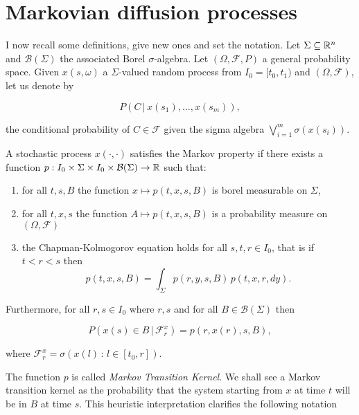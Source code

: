 \section{Markovian diffusion processes}

I now recall some definitions, give new ones and set the notation. Let $\Sigma\subseteq\mathbb{R}^n$ and $\mathcal{B}(\Sigma)$ 
the associated Borel $\sigma$-algebra. Let $(\Omega, \mathcal{F}, P)$ a general probability space. 
Given $x(s,\omega)$ a $\Sigma$-valued random process from $I_0=[t_0,t_1)$ and $(\Omega,\mathcal{F})$, let us denote by

\[P(C\,|\,x(s_1),\dots,x(s_m)),\]

the conditional probability of $C\in\mathcal{F}$ given the sigma algebra $\bigvee_{i=1}^m\sigma(x(s_i))$.

\begin{definition}\label{2-1-markovprocessdef}
    A stochastic process $x(\cdot, \cdot)$ satisfies the Markov property if there exists a function 
    $p:I_0\times \Sigma\times I_0\times  \mathcal{B}(\Sigma)\rightarrow \mathbb{R}$ such that:

    \begin{enumerate}
        \item for all $t,s,B$ the function $x\mapsto p(t,x,s,B)$ is borel measurable on $\Sigma$,
        \item for all $t,x,s$ the function $A\mapsto p(t,x,s,B)$ is a probability measure on $(\Omega,\mathcal{F})$
        \item the Chapman-Kolmogorov equation holds for all $s,t,r\in I_0$, that is if $t<r<s$ then
        \begin{equation}\label{2-1-markovprocessdef-chapkol}
            p(t,x,s,B) = \int_{\Sigma} p(r,y,s,B)\,p(t,x,r,dy).
        \end{equation}
    \end{enumerate}

    Furthermore, for all $r,s\in I_0$ where $r,s$ and for all $B\in\mathcal{B}(\Sigma)$ then

    \begin{equation}\label{2-1-markovprocessdef-condonp}
        P(x(s)\in B\,|\,\mathcal{F}_r^x) = p(r,x(r),s,B),
    \end{equation}

    where $\mathcal{F}_r^x=\sigma\left(x(l)\,:\,l\in[t_0,r]\right)$.
\end{definition}

The function $p$ is called \textit{Markov Transition Kernel}. We shall see a Markov transition kernel as 
the probability that the system starting from $x$ at time $t$ will be in $B$ at time $s$. This heuristic interpretation 
clarifies the following notation

